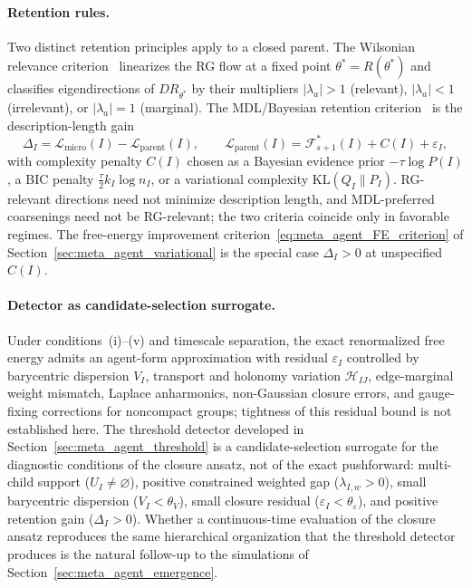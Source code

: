 \documentclass[11pt]{article}
\begin{document}
\paragraph{Retention rules.}
Two distinct retention principles apply to a closed parent. The Wilsonian relevance criterion~\cite{Wilson1971, wilson1975renormalization} linearizes the RG flow at a fixed point $\theta^* = R(\theta^*)$ and classifies eigendirections of $DR_{\theta^*}$ by their multipliers $|\lambda_a| > 1$ (relevant), $|\lambda_a| < 1$ (irrelevant), or $|\lambda_a| = 1$ (marginal). The MDL/Bayesian retention criterion~\cite{Schwarz1978, Rissanen1978} is the description-length gain
\begin{equation}
\Delta_I = \mathcal{L}_{\mathrm{micro}}(I) - \mathcal{L}_{\mathrm{parent}}(I), \qquad \mathcal{L}_{\mathrm{parent}}(I) = \mathcal{F}_{s+1}^*(I) + C(I) + \varepsilon_I,
\label{eq:rg_retention_gain}
\end{equation}
with complexity penalty $C(I)$ chosen as a Bayesian evidence prior $-\tau \log P(I)$, a BIC penalty $\tfrac{\tau}{2} k_I \log n_I$, or a variational complexity $\mathrm{KL}(Q_I \| P_I)$. RG-relevant directions need not minimize description length, and MDL-preferred coarsenings need not be RG-relevant; the two criteria coincide only in favorable regimes. The free-energy improvement criterion~\eqref{eq:meta_agent_FE_criterion} of Section~\ref{sec:meta_agent_variational} is the special case $\Delta_I > 0$ at unspecified $C(I)$.

\paragraph{Detector as candidate-selection surrogate.}
Under conditions~(i)--(v) and timescale separation, the exact renormalized free energy admits an agent-form approximation with residual $\varepsilon_I$ controlled by barycentric dispersion $V_I$, transport and holonomy variation $\mathcal{H}_{IJ}$, edge-marginal weight mismatch, Laplace anharmonics, non-Gaussian closure errors, and gauge-fixing corrections for noncompact groups; tightness of this residual bound is not established here. The threshold detector developed in Section~\ref{sec:meta_agent_threshold} is a candidate-selection surrogate for the diagnostic conditions of the closure ansatz, not of the exact pushforward: multi-child support ($U_I \neq \varnothing$), positive constrained weighted gap ($\lambda_{I,w} > 0$), small barycentric dispersion ($V_I < \theta_V$), small closure residual ($\varepsilon_I < \theta_\varepsilon$), and positive retention gain ($\Delta_I > 0$). Whether a continuous-time evaluation of the closure ansatz reproduces the same hierarchical organization that the threshold detector produces is the natural follow-up to the simulations of Section~\ref{sec:meta_agent_emergence}.
\end{document}
